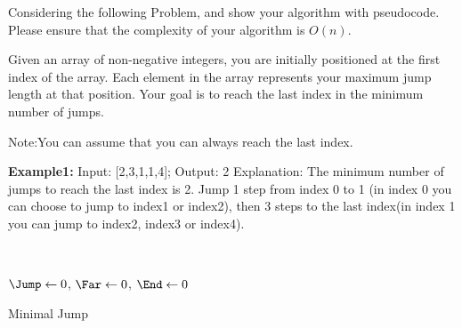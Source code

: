 \begin{exercise}[]{Considering the following Problem, and show your algorithm with pseudocode. Please ensure that the complexity of your algorithm is $O(n)$.

  Given an array of non-negative integers, you are initially positioned at the first index of the array. Each element in the array represents your maximum jump length at that position. Your goal is to reach the last index in the minimum number of jumps.

  
  Note:You can assume that you can always reach the last index.

  \textbf{Example1:} Input: [2,3,1,1,4]; Output: 2
  Explanation: The minimum number of jumps to reach the last index is 2. Jump 1 step from index 0 to 1 (in index 0 you can choose to jump to index1 or index2), then 3 steps to the last index(in index 1 you can jump to index2, index3 or index4).}
  \begin{solution}

  \par{~}

  \begin{algorithm}[H]

    \BlankLine
    $\Jump \leftarrow 0$, $\Far \leftarrow 0$, $\End \leftarrow 0$\;
    \caption{Minimal Jump\label{jump}}
  \end{algorithm}
  \end{solution}
  \label{ex4}
\end{exercise}